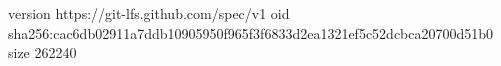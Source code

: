 version https://git-lfs.github.com/spec/v1
oid sha256:cac6db02911a7ddb10905950f965f3f6833d2ea1321ef5c52dcbca20700d51b0
size 262240
